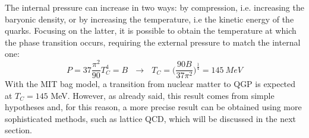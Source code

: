 The internal pressure can increase in two ways: by compression, i.e. increasing the baryonic density, or by increasing the temperature, i.e the kinetic energy of the quarks. Focusing on the latter, it is possible to obtain the temperature at which the phase transition occurs, requiring the external pressure to match the internal one: 
%
\begin{equation}
  P = 37 \frac{\pi^{2}}{90}T^{4}_{C} = B \ \ \ \longrightarrow \ \ \ T_{C} = \Big(\frac{90B}{37\pi^{2}}\Big)^{\frac{1}{4}}= 145 \ MeV
\end{equation}
%
With the MIT bag model, a transition from nuclear matter to QGP is expected at $T_{C} = 145$ MeV. However, as already said, this result comes from simple hypotheses and, for this reason, a more precise result can be obtained using more sophisticated methods, such as lattice QCD, which will be discussed in the next section.\\

